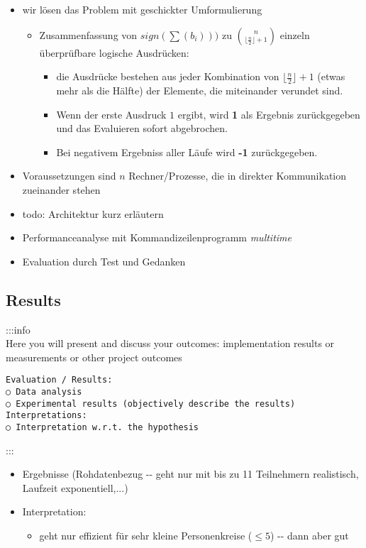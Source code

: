 \documentclass[
]{article}
\begin{document}
\begin{itemize}
\item
  wir lösen das Problem mit geschickter Umformulierung

  \begin{itemize}
  \item
    Zusammenfassung von \(sign(\sum(b_i)))\) zu
    \(\binom{n}{\lfloor\frac{n}{2}\rfloor+1}\) einzeln überprüfbare
    logische Ausdrücken:

    \begin{itemize}
    \item
      die Ausdrücke bestehen aus jeder Kombination von
      \(\lfloor\frac{n}{2}\rfloor+1\) (etwas mehr als die Hälfte) der
      Elemente, die miteinander verundet sind.
    \item
      Wenn der erste Ausdruck \(1\) ergibt, wird \textbf{1} als Ergebnis
      zurückgegeben und das Evaluieren sofort abgebrochen.
    \item
      Bei negativem Ergebniss aller Läufe wird \textbf{-1}
      zurückgegeben.
    \end{itemize}
  \end{itemize}
\item
  Voraussetzungen sind \(n\) Rechner/Prozesse, die in direkter
  Kommunikation zueinander stehen
\item
  todo: Architektur kurz erläutern
\item
  Performanceanalyse mit Kommandizeilenprogramm \emph{multitime}
\item
  Evaluation durch Test und Gedanken
\end{itemize}

\hypertarget{header-n81}{%
\subsection{\texorpdfstring{Results 🐧 }{Results 🐧 }}\label{header-n81}}

:::info\\
Here you will present and discuss your outcomes: implementation results
or measurements or other project outcomes

\begin{verbatim}
Evaluation / Results:
○ Data analysis
○ Experimental results (objectively describe the results)
Interpretations:
○ Interpretation w.r.t. the hypothesis
\end{verbatim}

:::

\begin{itemize}
\item
  Ergebnisse (Rohdatenbezug -\/- geht nur mit bis zu 11 Teilnehmern
  realistisch, Laufzeit exponentiell,...)
\item
  Interpretation:

  \begin{itemize}
  \item
    geht nur effizient für sehr kleine Personenkreise (\(\le 5\)) -\/-
    dann aber gut
  \end{itemize}
\end{itemize}
\end{document}
